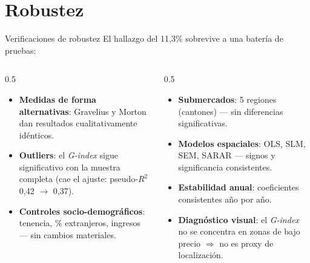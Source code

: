 \documentclass[11pt,aspectratio=169]{beamer}
\newcommand{\Gindex}{\textit{G-index}\xspace}
\begin{document}
\section{Robustez}
\begin{frame}{Verificaciones de robustez}
  El hallazgo del 11,3\% sobrevive a una batería de pruebas:
  \vspace{0.4em}
  \begin{columns}[T]
    \begin{column}{0.5\textwidth}
      \begin{itemize}\small
        \item \textbf{Medidas de forma alternativas}: Gravelius y Morton dan resultados cualitativamente idénticos.
        \item \textbf{Outliers}: el \Gindex sigue significativo con la muestra completa (cae el ajuste: pseudo-$R^2$ 0,42 $\to$ 0,37).
        \item \textbf{Controles socio-demográficos}: tenencia, \% extranjeros, ingresos — sin cambios materiales.
      \end{itemize}
    \end{column}
    \begin{column}{0.5\textwidth}
      \begin{itemize}\small
        \item \textbf{Submercados}: 5 regiones (cantones) — sin diferencias significativas.
        \item \textbf{Modelos espaciales}: OLS, SLM, SEM, SARAR — signos y significancia consistentes.
        \item \textbf{Estabilidad anual}: coeficientes consistentes año por año.
        \item \textbf{Diagnóstico visual}: el \Gindex no se concentra en zonas de bajo precio $\Rightarrow$ no es proxy de localización.
      \end{itemize}
    \end{column}
  \end{columns}
\end{frame}
\end{document}
